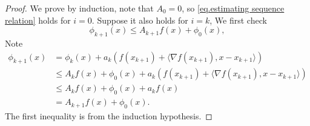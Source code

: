 \documentclass{article}
\begin{document}
\begin{proof}
We prove by induction, note that $A_0 = 0$, so \eqref{eq.estimating sequence relation} holds for $i=0$. Suppose it also holds for $i=k$, 
We first check  
$$\phi_{k+1}(x)\leq A_{k+1} f(x)+\phi_0(x),$$ 
Note
\begin{equation*}
    \begin{aligned}
        \phi_{k+1}(x)&=\phi_k(x)+a_k\left (f(x_{k+1})+\langle \nabla f(x_{k+1}),x-x_{k+1}\rangle \right)\\
        &\leq A_k f(x)+\phi_0(x) +a_k\left (f(x_{k+1})+\langle \nabla f(x_{k+1}),x-x_{k+1}\rangle \right)\\
        & \leq A_k f(x)+\phi_0(x) +a_k f(x)\\
        &=A_{k+1} f(x)+\phi_0(x).
    \end{aligned}
\end{equation*}
The first inequality is from the induction hypothesis.


\end{proof}
\end{document}
